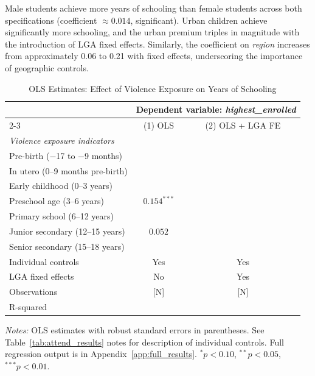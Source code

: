 Male students achieve more years of schooling than female students across
both specifications (coefficient $\approx 0.014$, significant). Urban
children achieve significantly more schooling, and the urban premium triples
in magnitude with the introduction of LGA fixed effects. Similarly, the
coefficient on \textit{region} increases from approximately 0.06 to 0.21
with fixed effects, underscoring the importance of geographic controls.

\begin{table}[H]
    \centering
    \caption{OLS Estimates: Effect of Violence Exposure on Years of Schooling}
    \label{tab:attainment_results}
    \begin{threeparttable}
        \begin{tabular}{lcc}
            \toprule
            & \multicolumn{2}{c}{Dependent variable: \textit{highest\_enrolled}} \\
            \cmidrule(lr){2-3}
            & (1) OLS & (2) OLS + LGA FE \\
            \midrule
            \multicolumn{3}{l}{\textit{Violence exposure indicators}} \\[0.3em]
            Pre-birth ($-$17 to $-$9 months) & & \\[0.3em]
            In utero (0–9 months pre-birth) & & \\[0.3em]
            Early childhood (0–3 years) & & \\[0.3em]
            Preschool age (3–6 years) & $0.154^{***}$ & \\[0.3em]
            Primary school (6–12 years) & & \\[0.3em]
            Junior secondary (12–15 years) & $0.052$ & \\[0.3em]
            Senior secondary (15–18 years) & & \\[0.5em]
            Individual controls & Yes & Yes \\
            LGA fixed effects   & No  & Yes \\
            \midrule
            Observations & [N] & [N] \\
            R-squared    & & \\
            \bottomrule
        \end{tabular}
        \begin{tablenotes}
            \small
            \item \textit{Notes:} OLS estimates with robust standard errors
            in parentheses. See Table~\ref{tab:attend_results} notes for
            description of individual controls. Full regression output is
            in Appendix~\ref{app:full_results}.
            $^{*}p < 0.10$, $^{**}p < 0.05$, $^{***}p < 0.01$.
        \end{tablenotes}
    \end{threeparttable}
\end{table}

